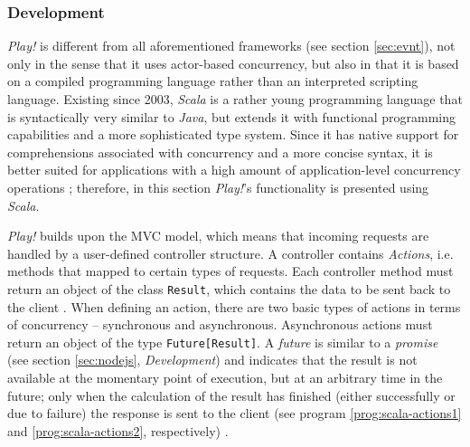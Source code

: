 \subsubsection*{Development}
\textit{Play!} is different from all aforementioned frameworks (see section \ref{sec:evnt}), not only in the sense that it uses actor-based concurrency, but also in that it is based on a compiled programming language rather than an interpreted scripting language. Existing since 2003, \textit{Scala} is a rather young programming language that is syntactically very similar to \textit{Java}, but extends it with functional programming capabilities and a more sophisticated type system. Since it has native support for comprehensions associated with concurrency and a more concise syntax, it is better suited for applications with a high amount of application-level concurrency operations \cite[p. 9]{Scala}; therefore, in this section \textit{Play!}'s functionality is presented using \textit{Scala}.

\textit{Play!} builds upon the MVC model, which means that incoming requests are handled by a user-defined controller structure. A controller contains \textit{Actions}, i.e. methods that mapped to certain types of requests. Each controller method must return an object of the class \texttt{Result}, which contains the data to be sent back to the client \cite[p. 27]{Reelsen2011}. When defining an action, there are two basic types of actions in terms of concurrency -- synchronous and asynchronous. Asynchronous actions must return an object of the type \texttt{Future[Result]}. A \textit{future} is similar to a \textit{promise} (see section \ref{sec:nodejs}, \textit{Development}) and indicates that the result is not available at the momentary point of execution, but at an arbitrary time in the future; only when the calculation of the result has finished (either successfully or due to failure) the response is sent to the client (see program \ref{prog:scala-actions1} and \ref{prog:scala-actions2}, respectively) \cite[p. 86]{Scala}. 

